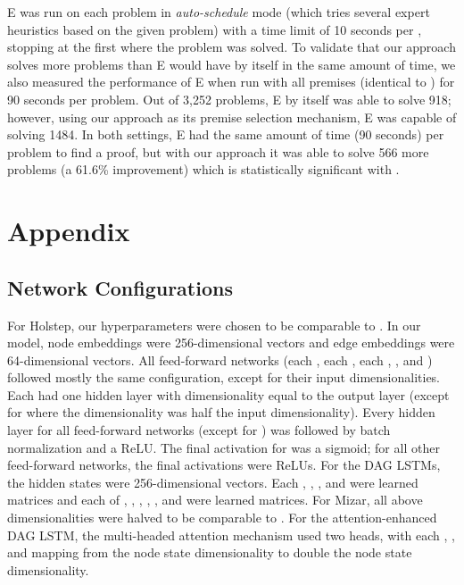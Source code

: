 \documentclass{article}
\begin{document}
E was run on each problem in \textit{auto-schedule} mode (which tries several expert heuristics based on the given problem) with a time limit of 10 seconds per , stopping at the first  where the problem was solved. To validate that our approach solves more problems than E would have by itself in the same amount of time, we also measured the performance of E when run with all premises (identical to ) for 90 seconds per problem. Out of 3,252 problems, E by itself was able to solve 918; however, using our approach as its premise selection mechanism, E was capable of solving 1484. In both settings, E had the same amount of time (90 seconds) per problem to find a proof, but with our approach it was able to solve 566 more problems (a 61.6\% improvement) which is statistically significant with .



 


 






\section{Appendix}
\label{sec:appendix}

\subsection{Network Configurations}

For Holstep, our hyperparameters were chosen to be comparable to \cite{wang2017premise}. In our model, node embeddings were 256-dimensional vectors and edge embeddings were 64-dimensional vectors. All feed-forward networks (each , each , each , , and ) followed mostly the same configuration, except for their input dimensionalities. Each had one hidden layer with dimensionality equal to the output layer (except for  where the dimensionality was half the input dimensionality). Every hidden layer for all feed-forward networks (except for ) was followed by batch normalization \cite{ioffe2015batch} and a ReLU. The final activation for  was a sigmoid; for all other feed-forward networks, the final activations were ReLUs. 
For the DAG LSTMs, the hidden states were 256-dimensional vectors. Each , , , and  were learned  matrices and each of , , , , , and  were learned  matrices. For Mizar, all above dimensionalities were halved to be comparable to \cite{kucik2018premise,olvsak2019property}. For the attention-enhanced DAG LSTM, the multi-headed attention mechanism used two heads, with each , , and  mapping from the node state dimensionality to double the node state dimensionality.
\end{document}
